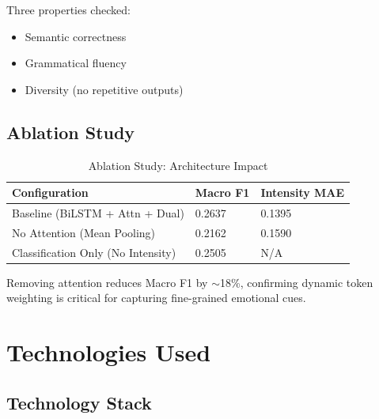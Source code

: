\documentclass[12pt, a4paper]{report}
\begin{document}
Three properties checked:
\begin{itemize}
    \item Semantic correctness
    \item Grammatical fluency
    \item Diversity (no repetitive outputs)
\end{itemize}

\section{Ablation Study}

\begin{table}[H]
    \centering
    \caption{Ablation Study: Architecture Impact}
    \label{tab:ablation}
    \begin{tabular}{@{}lll@{}}
        \toprule
        \textbf{Configuration} & \textbf{Macro F1} & \textbf{Intensity MAE} \\
        \midrule
        Baseline (BiLSTM + Attn + Dual) & 0.2637 & 0.1395 \\
        No Attention (Mean Pooling) & 0.2162 & 0.1590 \\
        Classification Only (No Intensity) & 0.2505 & N/A \\
        \bottomrule
    \end{tabular}
\end{table}

Removing attention reduces Macro F1 by $\sim$18\%, confirming dynamic token weighting is critical for capturing fine-grained emotional cues.

\chapter{Technologies Used}

\section{Technology Stack}
\end{document}
